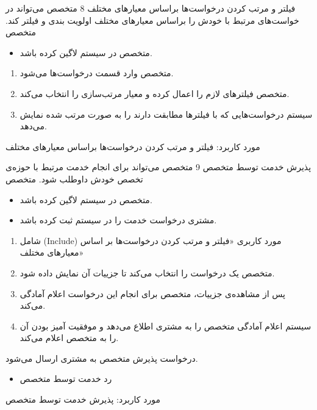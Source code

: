 \usecase
{فیلتر و مرتب کردن درخواست‌ها براساس معیارهای مختلف}
{8}
{متخصص می‌تواند در خواست‌های مرتبط با خودش را براساس معیارهای مختلف اولویت بندی و فیلتر کند.}
{متخصص}
{}
{	
	\begin{itemize}
		\vspace*{-0.6cm}
		\item 
		متخصص در سیستم لاگین کرده باشد.
	\end{itemize}
}
{
	\vspace*{-0.6cm}
	\begin{enumerate}
		\item 
		متخصص وارد قسمت درخواست‌ها می‌شود.
		\item
		متخصص فیلترهای لازم را اعمال کرده و معیار مرتب‌سازی را انتخاب می‌کند.
		\item
		سیستم درخواست‌هایی که با فیلترها مطابقت دارند را به صورت مرتب شده نمایش می‌دهد.
	\end{enumerate}
}
{}
{}
{
	مورد کاربرد: فیلتر و مرتب کردن درخواست‌ها براساس معیارهای مختلف
}


\usecase
{پذیرش خدمت توسط متخصص}
{9}
{متخصص می‌تواند برای انجام خدمت مرتبط با حوزه‌ی تخصص خودش داوطلب شود.}
{متخصص}
{}
{	
	\begin{itemize}
		\vspace*{-0.6cm}
		\item 
		متخصص در سیستم لاگین کرده باشد.
		\item
		مشتری درخواست خدمت را در سیستم ثبت کرده باشد.
	\end{itemize}
}
{
	\vspace*{-0.6cm}
	\begin{enumerate}
		\item 
		شامل (Include) مورد کاربری «فیلتر و مرتب کردن درخواست‌ها بر اساس معیارهای مختلف»
		\item
		متخصص یک درخواست را انتخاب می‌کند تا جزییات آن نمایش داده شود.
		\item
		پس از مشاهده‌ی جزییات، متخصص برای انجام این درخواست اعلام آمادگی می‌کند.
		\item
		سیستم اعلام آمادگی متخصص را به مشتری اطلاع می‌دهد و موفقیت آمیز بودن آن را به متخصص اعلام می‌کند.
	\end{enumerate}
}
{درخواست پذیرش متخصص به مشتری ارسال می‌شود.}
{
	\begin{itemize}
		\vspace*{-0.6cm}
		\item
		رد خدمت توسط متخصص
	\end{itemize}
}
{
	مورد کاربرد: پذیرش خدمت توسط متخصص
}

